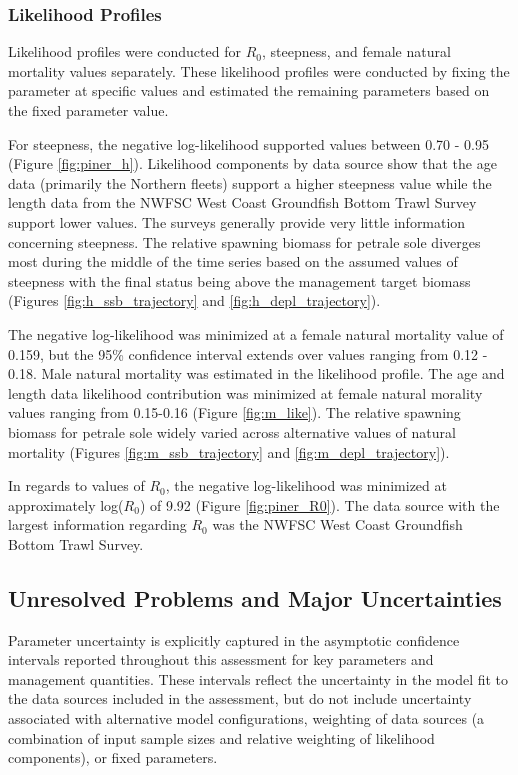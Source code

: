 \documentclass[12pt,]{article}
\begin{document}
\subsubsection{Likelihood Profiles}\label{likelihood-profiles}

Likelihood profiles were conducted for \(R_0\), steepness, and female
natural mortality values separately. These likelihood profiles were
conducted by fixing the parameter at specific values and estimated the
remaining parameters based on the fixed parameter value.

For steepness, the negative log-likelihood supported values between 0.70
- 0.95 (Figure \ref{fig:piner_h}). Likelihood components by data source
show that the age data (primarily the Northern fleets) support a higher
steepness value while the length data from the NWFSC West Coast
Groundfish Bottom Trawl Survey support lower values. The surveys
generally provide very little information concerning steepness. The
relative spawning biomass for petrale sole diverges most during the
middle of the time series based on the assumed values of steepness with
the final status being above the management target biomass (Figures
\ref{fig:h_ssb_trajectory} and \ref{fig:h_depl_trajectory}).

The negative log-likelihood was minimized at a female natural mortality
value of 0.159, but the 95\% confidence interval extends over values
ranging from 0.12 - 0.18. Male natural mortality was estimated in the
likelihood profile. The age and length data likelihood contribution was
minimized at female natural morality values ranging from 0.15-0.16
(Figure \ref{fig:m_like}). The relative spawning biomass for petrale
sole widely varied across alternative values of natural mortality
(Figures \ref{fig:m_ssb_trajectory} and \ref{fig:m_depl_trajectory}).

In regards to values of \(R_0\), the negative log-likelihood was
minimized at approximately log(\(R_0\)) of 9.92 (Figure
\ref{fig:piner_R0}). The data source with the largest information
regarding \(R_0\) was the NWFSC West Coast Groundfish Bottom Trawl
Survey.

\subsection{Unresolved Problems and Major
Uncertainties}\label{unresolved-problems-and-major-uncertainties-1}

Parameter uncertainty is explicitly captured in the asymptotic
confidence intervals reported throughout this assessment for key
parameters and management quantities. These intervals reflect the
uncertainty in the model fit to the data sources included in the
assessment, but do not include uncertainty associated with alternative
model configurations, weighting of data sources (a combination of input
sample sizes and relative weighting of likelihood components), or fixed
parameters.
\end{document}
